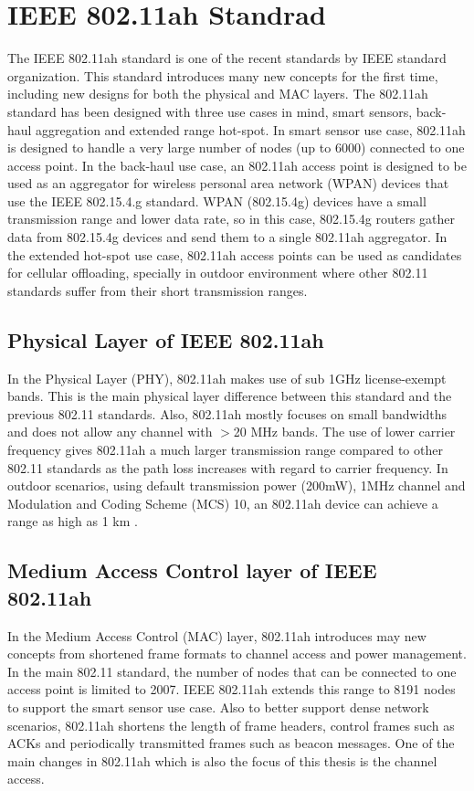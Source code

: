 \label{chapter:background}

\section{IEEE 802.11ah Standrad}

 The IEEE 802.11ah standard is one of the recent standards by IEEE standard organization. This standard introduces many new concepts for the first time, including new designs for both the physical and MAC layers. The 802.11ah standard has been designed with three use cases in mind, smart sensors, back-haul aggregation and extended range hot-spot. In smart sensor use case, 802.11ah is designed to handle a very large number of nodes (up to 6000) connected to one access point. In the back-haul use case, an 802.11ah access point is designed to be used as an aggregator for wireless personal area network (WPAN) devices that use the IEEE 802.15.4.g standard. WPAN (802.15.4g) devices have a small transmission range and lower data rate, so in this case, 802.15.4g routers gather data from 802.15.4g devices and send them to a single 802.11ah aggregator. In the extended hot-spot use case, 802.11ah access points can be used as candidates for cellular offloading, specially in outdoor environment where other 802.11 standards suffer from their short transmission ranges.

\subsection{Physical Layer of IEEE 802.11ah}
In the Physical Layer (PHY), 802.11ah makes use of sub 1GHz license-exempt bands. This is the main physical layer difference between this standard and the previous 802.11 standards. Also, 802.11ah mostly focuses on small bandwidths and does not allow any channel with $>$20 MHz bands. The use of lower carrier frequency gives 802.11ah a much larger transmission range compared to other 802.11 standards as the path loss increases with regard to carrier frequency. In outdoor scenarios, using default transmission power (200mW), 1MHz channel and Modulation and Coding Scheme (MCS) 10, an 802.11ah device can achieve a range as high as 1 km \cite{khorov2015survey}. 

\subsection{Medium Access Control layer of IEEE 802.11ah}
 In the Medium Access Control (MAC) layer, 802.11ah introduces may new concepts from shortened frame formats to channel access and power management. In the main 802.11 standard, the number of nodes that can be connected to one access point is limited to 2007. IEEE 802.11ah extends this range to 8191 nodes to support the smart sensor use case. Also to better support dense network scenarios, 802.11ah shortens the length of frame headers, control frames such as ACKs and periodically transmitted frames such as beacon messages. One of the main changes in 802.11ah which is also the focus of this thesis is the channel access. 

